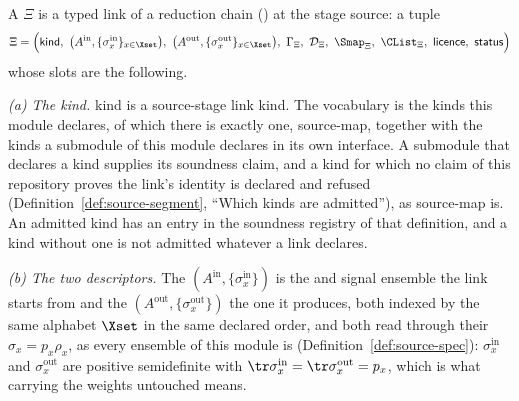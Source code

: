 \begin{definition}\label{def:source-link}
A  $\Xi$ is a typed link of a reduction chain
() at the stage
\textsf{source}: a tuple
\begin{equation}\label{eq:source-link}
  \Xi=\Big(\textsf{kind},\
  \big(A^{\mathrm{in}},\{\sigma^{\mathrm{in}}_x\}_{x\in\Xset}\big),\
  \big(A^{\mathrm{out}},\{\sigma^{\mathrm{out}}_x\}_{x\in\Xset}\big),\
  \Gamma_{\Xi},\ \mathcal{D}_{\Xi},\ \Smap_{\Xi},\
  \CList_{\Xi},\ \textsf{licence},\ \textsf{status}\Big)
\end{equation}
whose slots are the following.

\emph{(a) The kind.} \textsf{kind} is a source-stage link kind. The
vocabulary is the kinds this module declares, of which there is exactly one,
\textsf{source-map}, together with the kinds a submodule of this module
declares in its own interface. A submodule that declares a kind supplies its
soundness claim, and a kind for which no claim of this repository proves the
link's identity is declared and refused
(Definition~\ref{def:source-segment}, ``Which kinds are admitted''), as
\textsf{source-map} is. An admitted kind has an entry in the soundness
registry of that definition, and a kind without one is not admitted whatever
a link declares.

\emph{(b) The two descriptors.} The 
$(A^{\mathrm{in}},\{\sigma^{\mathrm{in}}_x\})$ is the  and
signal ensemble the link starts from and the 
$(A^{\mathrm{out}},\{\sigma^{\mathrm{out}}_x\})$ the one it produces, both
indexed by the same alphabet $\Xset$ in the same declared order, and both
read through their \tref{weighted members} $\sigma_x=p_x\rho_x$, as every ensemble
of this module is (Definition~\ref{def:source-spec}): $\sigma^{\mathrm{in}}_x$ and
$\sigma^{\mathrm{out}}_x$ are positive semidefinite with
$\tr\sigma^{\mathrm{in}}_x=\tr\sigma^{\mathrm{out}}_x=p_x$, which is what
carrying the weights untouched means.


\end{definition}
